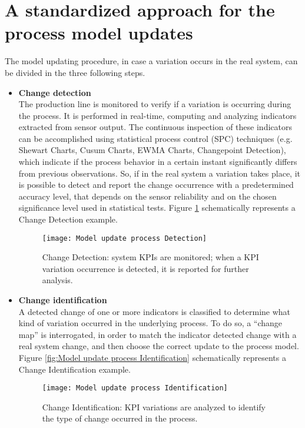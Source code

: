 \section{A standardized approach for the process model updates}
The model updating procedure, in case a variation occurs in the real system, can be divided in the three following steps.
\begin{itemize}
\item \textbf{Change detection}\\The production line is monitored to verify if a variation is occurring during the process. It is performed in real-time, computing and analyzing indicators extracted from sensor output. The continuous inspection of these indicators can be accomplished using statistical process control (SPC) techniques (e.g. Shewart Charts, Cusum Charts, EWMA Charts, Changepoint Detection), which indicate if the process behavior in a certain instant significantly differs from previous observations. So, if in the real system a variation takes place, it is possible to detect and report the change occurrence with a predetermined accuracy level, that depends on the sensor reliability and on the chosen significance level used in statistical tests. Figure \ref{fig:Model update process Detection} schematically represents a Change Detection example.
\begin{figure}[H] 
\centering    
\texttt{[image: Model update process Detection]}
\caption[Model update process: Change Detection]{Change Detection: system KPIs are monitored; when a KPI variation occurrence is detected, it is reported for further analysis.}
\label{fig:Model update process Detection}
\end{figure}
\item \textbf{Change identification}\\A detected change of one or more indicators is classified to determine what kind of variation occurred in the underlying process. To do so, a “change map” is interrogated, in order to match the indicator detected change with a real system change, and then choose the correct update to the process model. Figure \ref{fig:Model update process Identification} schematically represents a Change Identification example.
\begin{figure}[H] 
\centering    
\texttt{[image: Model update process Identification]}
\caption[Model update process: Change Identification]{Change Identification: KPI variations are analyzed to identify the type of change occurred in the process.}

\end{figure}
\end{itemize}

